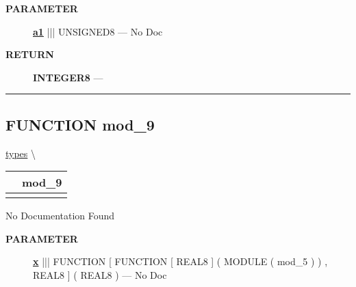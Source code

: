 \par
\begin{description}
\item [\colorbox{tagtype}{\color{white} \textbf{\textsf{PARAMETER}}}] \textbf{\underline{a1}} ||| UNSIGNED8 --- No Doc
\end{description}







\par
\begin{description}
\item [\colorbox{tagtype}{\color{white} \textbf{\textsf{RETURN}}}] \textbf{INTEGER8} --- 
\end{description}




\rule{\linewidth}{0.5pt}
\subsection*{\textsf{\colorbox{headtoc}{\color{white} FUNCTION}
mod\_9}}

\hypertarget{ecldoc:types.mod_9}{}
\hspace{0pt} \hyperlink{ecldoc:types}{types} \textbackslash 

{\renewcommand{\arraystretch}{1.5}
\begin{tabularx}{\textwidth}{|>{\raggedright\arraybackslash}l|X|}
\hline
\hspace{0pt}\mytexttt{\color{red} } & \textbf{mod\_9} \\
\hline
\multicolumn{2}{|>{\raggedright\arraybackslash}X|}{\hspace{0pt}\mytexttt{\color{param} (mod\_7 x)}} \\
\hline
\end{tabularx}
}

\par





No Documentation Found






\par
\begin{description}
\item [\colorbox{tagtype}{\color{white} \textbf{\textsf{PARAMETER}}}] \textbf{\underline{x}} ||| FUNCTION [ FUNCTION [ REAL8 ] ( MODULE ( mod\_5 ) ) , REAL8 ] ( REAL8 ) --- No Doc
\end{description}







